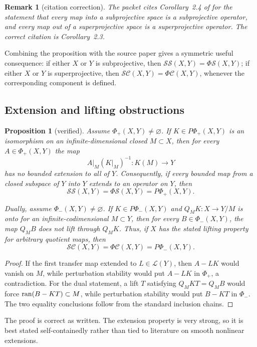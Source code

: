 \documentclass[11pt]{article}
\newtheorem{proposition}[theorem]{Proposition}
\newtheorem{remark}[theorem]{Remark}
\theoremstyle{definition}
\newcommand{\Lop}{\mathcal L}
\newcommand{\SSing}{\mathcal{SS}}
\newcommand{\SCos}{\mathcal{SC}}
\newcommand{\PhiS}{\Phi\mathcal S}
\newcommand{\PhiC}{\Phi\mathcal C}
\newcommand{\PhiP}{\Phi_+}
\newcommand{\PhiM}{\Phi_-}
\newcommand{\PPhiP}{P\Phi_+}
\newcommand{\PPhiM}{P\Phi_-}
\newcommand{\ran}{\mathop{\rm ran}}
\begin{document}
\begin{remark}[citation correction]
The packet cites Corollary~2.4 of \cite{GP2024} for the statement that every map into a
subprojective space is a subprojective operator, and every map out of a superprojective
space is a superprojective operator.  The correct citation is Corollary~2.3.
\end{remark}

Combining the proposition with the source paper gives a symmetric useful consequence:
if either \(X\) or \(Y\) is subprojective, then
\(\SSing(X,Y)=\PhiS(X,Y)\); if either \(X\) or \(Y\) is superprojective, then
\(\SCos(X,Y)=\PhiC(X,Y)\), whenever the corresponding component is defined.

\subsection{Extension and lifting obstructions}

\begin{proposition}[verified]
Assume \(\PhiP(X,Y)\ne\varnothing\).
If \(K\in\PPhiP(X,Y)\) is an isomorphism on an infinite-dimensional closed
\(M\subset X\), then for every \(A\in\PhiP(X,Y)\) the map
\[
 A|_M(K|_M)^{-1}\colon K(M)\longrightarrow Y
\]
has no bounded extension to all of \(Y\).  Consequently, if every bounded map from a
closed subspace of \(Y\) into \(Y\) extends to an operator on \(Y\), then
\[
 \SSing(X,Y)=\PhiS(X,Y)=\PPhiP(X,Y).
\]

Dually, assume \(\PhiM(X,Y)\ne\varnothing\).  If \(K\in\PPhiM(X,Y)\) and
\(Q_MK\colon X\to Y/M\) is onto for an infinite-codimensional \(M\subset Y\), then
for every \(B\in\PhiM(X,Y)\), the map \(Q_MB\) does not lift through \(Q_MK\).
Thus, if \(X\) has the stated lifting property for arbitrary quotient maps, then
\[
 \SCos(X,Y)=\PhiC(X,Y)=\PPhiM(X,Y).
\]
\end{proposition}

\begin{proof}
If the first transfer map extended to \(L\in\Lop(Y)\), then \(A-LK\) would vanish on
\(M\), while perturbation stability would put \(A-LK\) in \(\PhiP\), a contradiction.
For the dual statement, a lift \(T\) satisfying \(Q_MKT=Q_MB\) would force
\(\ran(B-KT)\subset M\), while perturbation stability would put \(B-KT\) in
\(\PhiM\).  The two equality conclusions follow from the standard inclusion chains.
\end{proof}

The proof is correct as written.  The extension property is very strong, so it is best
stated self-containedly rather than tied to literature on smooth nonlinear extensions.
\end{document}
